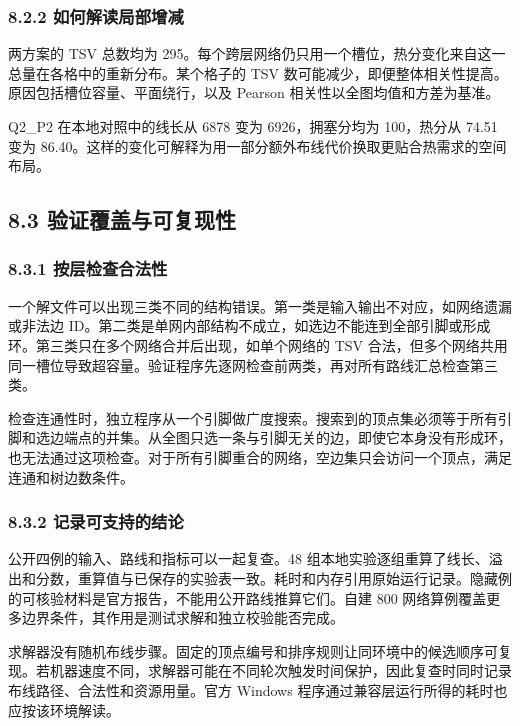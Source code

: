 \documentclass[12pt,a4paper]{article}
\begin{document}
\subsubsection{8.2.2
如何解读局部增减}\label{ux5982ux4f55ux89e3ux8bfbux5c40ux90e8ux589eux51cf}

两方案的 TSV 总数均为
295。每个跨层网络仍只用一个槽位，热分变化来自这一总量在各格中的重新分布。某个格子的
TSV 数可能减少，即便整体相关性提高。原因包括槽位容量、平面绕行，以及
Pearson 相关性以全图均值和方差为基准。

Q2\_P2 在本地对照中的线长从 6878 变为 6926，拥塞分均为 100，热分从 74.51
变为
86.40。这样的变化可解释为用一部分额外布线代价换取更贴合热需求的空间布局。

\subsection{8.3
验证覆盖与可复现性}\label{ux9a8cux8bc1ux8986ux76d6ux4e0eux53efux590dux73b0ux6027}

\subsubsection{8.3.1
按层检查合法性}\label{ux6309ux5c42ux68c0ux67e5ux5408ux6cd5ux6027}

一个解文件可以出现三类不同的结构错误。第一类是输入输出不对应，如网络遗漏或非法边
ID。第二类是单网内部结构不成立，如选边不能连到全部引脚或形成环。第三类只在多个网络合并后出现，如单个网络的
TSV
合法，但多个网络共用同一槽位导致超容量。验证程序先逐网检查前两类，再对所有路线汇总检查第三类。

检查连通性时，独立程序从一个引脚做广度搜索。搜索到的顶点集必须等于所有引脚和选边端点的并集。从全图只选一条与引脚无关的边，即使它本身没有形成环，也无法通过这项检查。对于所有引脚重合的网络，空边集只会访问一个顶点，满足连通和树边数条件。

\subsubsection{8.3.2
记录可支持的结论}\label{ux8bb0ux5f55ux53efux652fux6301ux7684ux7ed3ux8bba}

公开四例的输入、路线和指标可以一起复查。48
组本地实验逐组重算了线长、溢出和分数，重算值与已保存的实验表一致。耗时和内存引用原始运行记录。隐藏例的可核验材料是官方报告，不能用公开路线推算它们。自建
800 网络算例覆盖更多边界条件，其作用是测试求解和独立校验能否完成。

求解器没有随机布线步骤。固定的顶点编号和排序规则让同环境中的候选顺序可复现。若机器速度不同，求解器可能在不同轮次触发时间保护，因此复查时同时记录布线路径、合法性和资源用量。官方
Windows 程序通过兼容层运行所得的耗时也应按该环境解读。
\end{document}
